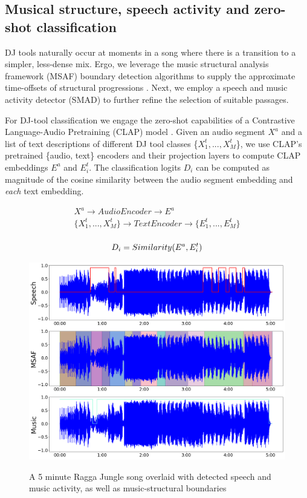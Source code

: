 \documentclass{article}
\begin{document}
\subsection{Musical structure, speech activity and zero-shot classification}\label{sec:djtool_classes}
DJ tools naturally occur at moments in a song where there is a transition to a simpler, less-dense mix. Ergo, we leverage the music structural analysis framework (MSAF) boundary detection algorithms to supply the approximate time-offsets of structural progressions \cite{nieto2016systematic}. Next, we employ a speech and music activity detector (SMAD)\cite{Hung2022} to further refine the selection of suitable passages.

For DJ-tool classification we engage the zero-shot capabilities of a Contrastive Language-Audio Pretraining (CLAP) model \cite{elizalde2022claplearningaudioconcepts}. Given an audio segment $X^{a}$ and a list of text descriptions of different DJ tool classes \{$X^{t}_{1},...,X^{t}_{M}$\}, we use CLAP's pretrained \{audio, text\} encoders and their projection layers to compute CLAP embeddings $E^a$ and $E^t_i$. The classification logits $D_i$ can be computed as magnitude of the cosine similarity between the audio segment embedding and \textit{each} text embedding.

\begin{equation}
\begin{matrix}
    X^{a} \rightarrow AudioEncoder \rightarrow E^{a} \\ 
    \{X^{t}_{1},...,X^{t}_{M}\} \rightarrow TextEncoder \rightarrow \{E^{t}_{1},...,E^{t}_{M}\} \\ 
\end{matrix}
\end{equation}

\begin{equation}
    D_i = Similarity(E^a, E^{t}_{i}) \\ 
\end{equation}


\begin{figure}
 \centerline{
 	\includegraphics[alt={SMAD \& MSAF Analysis signals}, width=0.9\columnwidth]{smad_msaf.png}}
 \caption{A 5 minute Ragga Jungle song overlaid with detected speech and music activity, as well as music-structural boundaries}
 \label{fig:msafsmadplot}
\end{figure}
\end{document}
